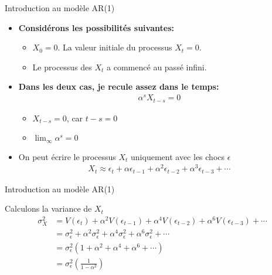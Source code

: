 \documentclass{beamer}
\begin{document}
\begin{frame}{Introduction au modèle AR(1)}

\begin{itemize}
\item \textbf{Considérons les possibilités suivantes:}
\begin{itemize}
\item $X_0 = 0$. La valeur initiale du processus $X_t=0$.
\item Le processus des $X_t$ a commencé au passé infini.
\end{itemize}
\item \textbf{Dans les deux cas, je recule assez dans le temps:}
\begin{align*}
\alpha^sX_{t-s}=0
\end{align*}
\begin{itemize}
\item $X_{t-s}=0$, car $t-s=0$
\item $\lim_{\infty}\alpha^s=0$
\end{itemize}
\item On peut écrire le processus $X_t$ uniquement avec les chocs $\epsilon$
\begin{align*}
X_t \approx \epsilon_t+\alpha \epsilon_{t-1}+\alpha^2\epsilon_{t-2}+\alpha^3\epsilon_{t-3}+\cdots
\end{align*}
\end{itemize}

\end{frame}

\begin{frame}{Introduction au modèle AR(1)}
\begin{block}{Calculons la variance de $X_t$}
\begin{align*}
\sigma_X^2 & =V(\epsilon_t)+\alpha^2 V(\epsilon_{t-1})+\alpha^4V(\epsilon_{t-2})+\alpha^6V(\epsilon_{t-3})+\cdots\\
& = \sigma_{\epsilon}^2+\alpha^2 \sigma_{\epsilon}^2+\alpha^4 \sigma_{\epsilon}^2+\alpha^6 \sigma_{\epsilon}^2+\cdots\\
& =\sigma_{\epsilon}^2(1+\alpha^2+\alpha^4+\alpha^6+\cdots)\\
&= \sigma_{\epsilon}^2 \left( \frac{1}{1-\alpha^2} \right)
\end{align*}
\end{block}
\end{frame}
\end{document}
